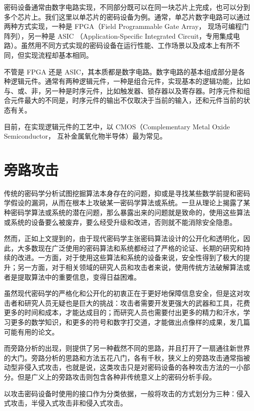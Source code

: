 密码设备通常由数字电路实现，不同部分既可以在同一块芯片上完成，也可以分到多个芯片上。我们这里以单芯片的密码设备为例。通常，单芯片数字电路可以通过两种方式实现，一种是 FPGA（Field Programmable Gate Array， 现场可编程门阵列），另一种是 ASIC （Application-Specific Integrated Circuit，专用集成电路）。虽然用不同方式实现的密码设备在运行性能、工作场景以及成本上有所不同，但实现流程却基本相同。

不管是 FPGA 还是 ASIC，其本质都是数字电路。数字电路的基本组成部分是各种逻辑元件。通常有两种逻辑元件，一种是组合元件，实现基本的逻辑功能，比如与、或、非，另一种是时序元件，比如触发器、锁存器以及寄存器。时序元件和组合元件最大的不同是，时序元件的输出不仅取决于当前的输入，还和元件当前的状态有关。

目前，在实现逻辑元件的工艺中，以 CMOS（Complementary Metal Oxide Semiconductor， 互补金属氧化物半导体）最为常见。

\section{旁路攻击} %
传统的密码学分析试图挖掘算法本身存在的问题，抑或是寻找某些数学前提和密码学假设的漏洞，从而在根本上攻破某一密码学算法或系统。一旦从理论上揭露了某种密码学算法或系统的潜在问题，那么暴露出来的问题就是致命的，使用这些算法或系统的设备要么被废弃，要么经受升级和改进，否则就不能消除安全隐患。

然而，正如上文提到的，由于现代密码学主张密码算法设计的公开化和透明化，因此，大多数现在广泛使用的密码算法和系统都经过了严格的论证、长期的研究和持续的改进。一方面，对于使用这些算法和系统的设备来说，安全性得到了极大的提升；另一方面，对于相关领域的研究人员和攻击者来说，使用传统方法破解算法或者是提取算法中的重要信息，变得日益困难。

虽然现代密码学的严格化和公开化的初衷正在于更好地保障信息安全，但是这对攻击者和研究人员无疑也是巨大的挑战：攻击者需要开发更强大的武器和工具，花费更多的时间和成本，才能达成目的；而研究人员也需要付出更多的精力和汗水，学习更多的数学知识，和更多的符号和数字打交道，才能做出点像样的成果，发几篇可能有用的论文。

而旁路分析的出现，则提供了另一种截然不同的思路，并且打开了一扇通往新世界的大门。旁路分析的思路和方法五花八门，各有千秋，狭义上的旁路攻击通常指被动型非侵入式攻击，也就是说，这类攻击只是对密码设备的各种攻击方法的一小部分。但是广义上的旁路攻击则包含各种非传统意义上的密码分析手段。

以攻击密码设备时使用的接口作为分类依据，一般将攻击的方式划分为三种：侵入式攻击，半侵入式攻击非和侵入式攻击。


